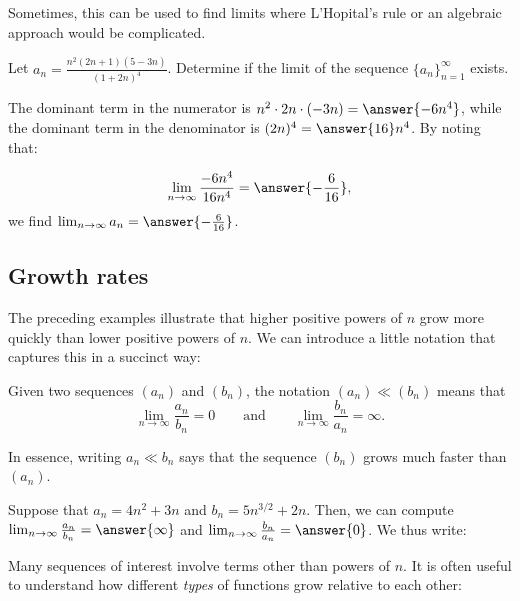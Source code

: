 \documentclass{ximera}
\begin{document}
Sometimes, this can be used to find limits where L'Hopital's rule or an algebraic approach would be complicated.

\begin{example}
Let $a_n = \frac{n^2(2n+1)(5-3n)}{(1+2n)^4}$.  Determine if the limit of the sequence $\{a_n\}_{n=1}^{\infty}$ exists.

\begin{explanation}
The dominant term in the numerator is $n^2 \cdot 2n \cdot (-3n) = \answer{-6n^4}$, while the dominant term in the denominator is $(2n)^4 = \answer{16}n^4$.  By noting that:

\[
\lim_{n \to \infty} \frac{-6n^4}{16n^4} = \answer{-\frac{6}{16}},
\]
we find $\lim_{n \to \infty} a_n = \answer{-\frac{6}{16}}$.
\end{explanation}
\end{example}
 
\subsection{Growth rates}
The preceding examples illustrate that higher positive powers of $n$ grow more quickly than lower positive powers of $n$.  We can introduce a little notation that captures this in a succinct way:

\begin{definition}
  Given two sequences $(a_n)$ and $(b_n)$, the notation $(a_n) \ll
  (b_n)$ means that
  \[
  \lim_{n\to\infty} \frac{a_n}{b_n} =
  0\qquad\text{and}\qquad\lim_{n\to\infty} \frac{b_n}{a_n} =\infty.
  \]
\end{definition}

In essence, writing $a_n \ll b_n$ says that the sequence $(b_n)$ grows
much faster than $(a_n)$.

\begin{example}
Suppose that $a_n = 4n^2+3n$ and $b_n = 5n^{3/2}+2n$.  Then, we can compute $\lim_{n \to \infty} \frac{a_n}{b_n} = \answer{\infty}$ and $\lim_{n \to \infty} \frac{b_n}{a_n} = \answer{0}$.  We thus write:

\begin{multipleChoice}
\end{multipleChoice}

\end{example}

Many sequences of interest involve terms other than powers of $n$.  It is often useful to understand how different \emph{types} of functions grow relative to each other:
\end{document}
